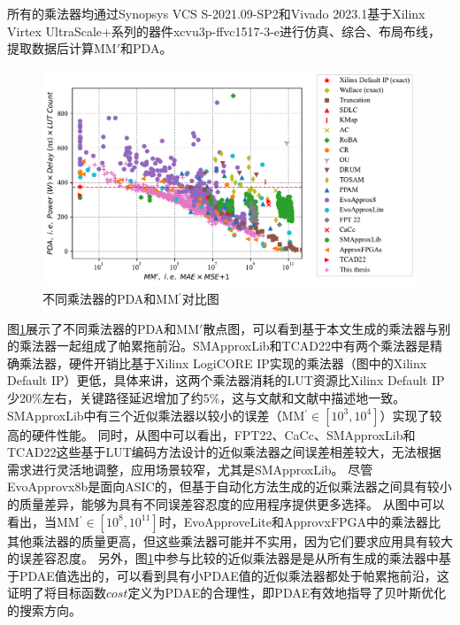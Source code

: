 所有的乘法器均通过Synopsys VCS S-2021.09-SP2和Vivado 2023.1基于Xilinx Virtex UltraScale+系列的器件xcvu3p-ffvc1517-3-e进行仿真、综合、布局布线，提取数据后计算MM$\prime$和PDA。

\begin{figure}[!htbp]
    \centering
    \includegraphics[width=\linewidth]{./figs/AC-AM-FPGA-AMG-PDA_MM_prime.pdf}
    \caption{不同乘法器的PDA和MM$^{\prime}$对比图}
    \label{AC:AM:FPGA:AMG:Fig:PDA_MM_prime}
\end{figure}

图\ref{AC:AM:FPGA:AMG:Fig:PDA_MM_prime}展示了不同乘法器的PDA和MM$\prime$散点图，可以看到基于本文生成的乘法器与别的乘法器一起组成了帕累拖前沿。SMApproxLib和TCAD22中有两个乘法器是精确乘法器，硬件开销比基于Xilinx LogiCORE IP实现的乘法器（图中的Xilinx Default IP）更低，具体来讲，这两个乘法器消耗的LUT资源比Xilinx Default IP少20\%左右，关键路径延迟增加了约5\%，这与文献\cite{AC:AM:FPGA:SMApproxLib}和文献\cite{AC:AM:FPGA:TCAD22}中描述地一致。
SMApproxLib中有三个近似乘法器以较小的误差（MM$^\prime\in[10^3,10^4]$）实现了较高的硬件性能。
同时，从图中可以看出，FPT22、CaCc、SMApproxLib和TCAD22这些基于LUT编码方法设计的近似乘法器之间误差相差较大，无法根据需求进行灵活地调整，应用场景较窄，尤其是SMApproxLib。
尽管EvoApprovx8b\cite{AC:AM:CGP_Evoapprox8b}是面向ASIC的，但基于自动化方法生成的近似乘法器之间具有较小的质量差异，能够为具有不同误差容忍度的应用程序提供更多选择。
从图中可以看出，当MM$^\prime \in [10^8,10^{11}]$时，EvoApproveLite\cite{AC:AM:CGP_EvoLite}和ApprovxFPGA\cite{AC:AM:FPGA:ApproxFPGAs}中的乘法器比其他乘法器的质量更高，但这些乘法器可能并不实用，因为它们要求应用具有较大的误差容忍度。
另外，图\ref{AC:AM:FPGA:AMG:Fig:PDA_MM_prime}中参与比较的近似乘法器是是从所有生成的乘法器中基于PDAE值选出的，可以看到具有小PDAE值的近似乘法器都处于帕累拖前沿，这证明了将目标函数$cost$定义为PDAE的合理性，即PDAE有效地指导了贝叶斯优化的搜索方向。


